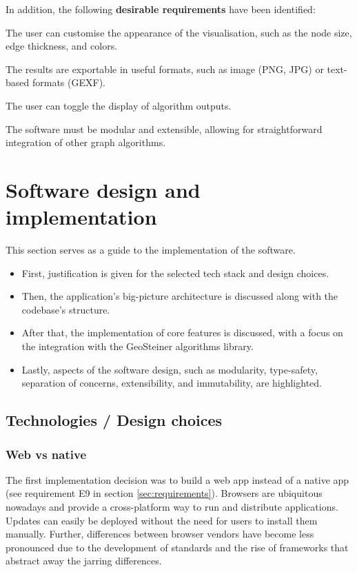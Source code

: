 \documentclass{l4proj}
\begin{document}
In addition, the following \textbf{desirable requirements} have been identified:
\begin{desirables}
    \item The user can customise the appearance of the visualisation, such as the node size, edge thickness, and colors.
    \item The results are exportable in useful formats, such as image (PNG, JPG) or text-based formats (GEXF).
    \item The user can toggle the display of algorithm outputs.
    \item The software must be modular and extensible, allowing for straightforward integration of other graph algorithms.
\end{desirables}

\chapter{Software design and implementation}
\label{sec:software_design_and_implementation}
This section serves as a guide to the implementation of the software.
\begin{itemize}
    \item First, justification is given for the selected tech stack and design choices.
    \item Then, the application's big-picture architecture is discussed along with the codebase's structure.
    \item After that, the implementation of core features is discussed, with a focus on the integration with the GeoSteiner algorithms library.
    \item Lastly, aspects of the software design, such as modularity, type-safety, separation of concerns, extensibility, and immutability, are highlighted.
\end{itemize}

\section{Technologies / Design choices}
\subsection{Web vs native}
The first implementation decision was to build a web app instead of a native app (see requirement E9 in section \ref{sec:requirements}). Browsers are ubiquitous nowadays and provide a cross-platform way to run and distribute applications. Updates can easily be deployed without the need for users to install them manually. Further, differences between browser vendors have become less pronounced due to the development of standards and the rise of frameworks that abstract away the jarring differences.
\end{document}
